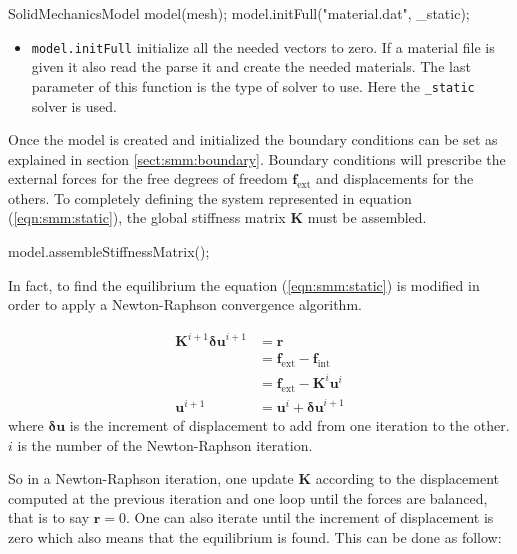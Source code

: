 \documentclass[a4paper,11pt]{book}
\newcommand{\code}[1]{\texttt{#1}}
\renewcommand{\vec}[1]{\ensuremath{\boldsymbol{#1}}}
\newcommand{\mat}[1]{\ensuremath{\boldsymbol{#1}}}
\newcommand{\st}[1]{{\mathrm{#1}}}
\begin{document}
\begin{cpp}
  SolidMechanicsModel model(mesh);
  model.initFull("material.dat", _static);
\end{cpp}


\begin{itemize}
\item  \code{model.initFull} initialize  all the  needed vectors  to zero.  If a
  material  file is  given  it also  read the  parse  it and  create the  needed
  materials.  The last  parameter of  this  function is  the type  of solver  to
  use. Here the \code{\_static} solver is used.
\end{itemize}


Once the model is created and  initialized the boundary conditions can be set as
explained   in  section   \ref{sect:smm:boundary}.   Boundary   conditions  will
prescribe   the   external   forces    for   the   free   degrees   of   freedom
$\vec{f_{\st{ext}}}$ and  displacements for the others.   To completely defining
the system represented in  equation (\ref{eqn:smm:static}), the global stiffness
matrix            $\mat{K}$             must            be            assembled.

\begin{cpp}
  model.assembleStiffnessMatrix();
\end{cpp}

In fact, to find the equilibrium the equation (\ref{eqn:smm:static}) is modified
in order to apply a Newton-Raphson convergence algorithm.

\begin{align}\label{eqn:smm:static-newton-raphson}
  \mat{K}^{i+1} \vec{\delta u}^{i+1} &= \vec{r} \\
  &= \vec{f_{\st{ext}}} - \vec{f_{\st{int}}}\\
  &= \vec{f_{\st{ext}}} - \mat{K}^{i} \vec{u}^{i}\\
  \vec{u}^{i+1} &= \vec{u}^{i} + \vec{\delta u}^{i+1}\nonumber
\end{align}
where  $\vec{\delta  u}$ is  the  increment of  displacement  to  add from  one
iteration to the other. $i$ is the number of the Newton-Raphson iteration.

So  in  a  Newton-Raphson  iteration,  one update  $\mat{K}$  according  to  the
displacement computed  at the previous iteration  and one loop  until the forces
are balanced,  that is to  say $\vec{r}  = 0$.  One  can also iterate  until the
increment  of displacement  is zero  which also  means that  the  equilibrium is
found. This can be done as follow:
\end{document}

